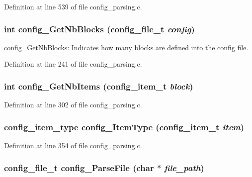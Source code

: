 Definition at line 539 of file config\_\-parsing.c.
\subsubsection[{config\_\-GetNbBlocks}]{\setlength{\rightskip}{0pt plus 5cm}int config\_\-GetNbBlocks (config\_\-file\_\-t {\em config})}\label{config__parsing_8c_1ad32491496feb6301ee1f4e8d9b72a0}


config\_\-GetNbBlocks: Indicates how many blocks are defined into the config file. 

Definition at line 241 of file config\_\-parsing.c.
\subsubsection[{config\_\-GetNbItems}]{\setlength{\rightskip}{0pt plus 5cm}int config\_\-GetNbItems (config\_\-item\_\-t {\em block})}\label{config__parsing_8c_098e7a2614baf20bb96f612c3d7b8d69}




Definition at line 302 of file config\_\-parsing.c.
\subsubsection[{config\_\-ItemType}]{\setlength{\rightskip}{0pt plus 5cm}config\_\-item\_\-type config\_\-ItemType (config\_\-item\_\-t {\em item})}\label{config__parsing_8c_447e838f4a3252ddabd4dc0be3bb6cdb}




Definition at line 354 of file config\_\-parsing.c.
\subsubsection[{config\_\-ParseFile}]{\setlength{\rightskip}{0pt plus 5cm}config\_\-file\_\-t config\_\-ParseFile (char $\ast$ {\em file\_\-path})}\label{config__parsing_8c_27122b19350d87c1c46d4c3630a80826}




